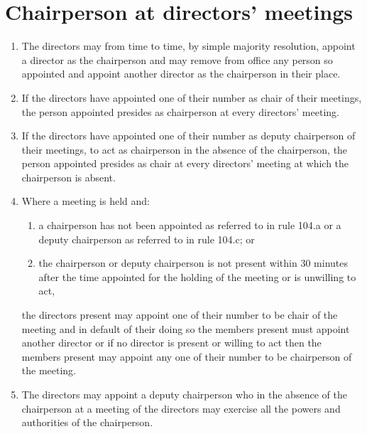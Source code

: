 \section{Chairperson at directors' meetings}

\begin{enumerate}[label=(\alph*)]
    \item The directors may from time to time, by simple majority resolution, appoint a director as the chairperson and may remove from office any person so appointed and appoint another director as the chairperson in their place.
    
    \item If the directors have appointed one of their number as chair of their meetings, the person appointed presides as chairperson at every directors' meeting.
    
    \item If the directors have appointed one of their number as deputy chairperson of their meetings, to act as chairperson in the absence of the chairperson, the person appointed presides as chair at every directors' meeting at which the chairperson is absent.
    
    \item Where a meeting is held and:
    \begin{enumerate}[label=(\roman*)]
        \item a chairperson has not been appointed as referred to in rule 104.a or a deputy chairperson as referred to in rule 104.c; or
        \item the chairperson or deputy chairperson is not present within 30 minutes after the time appointed for the holding of the meeting or is unwilling to act,
    \end{enumerate}
    
    the directors present may appoint one of their number to be chair of the meeting and in default of their doing so the members present must appoint another director or if no director is present or willing to act then the members present may appoint any one of their number to be chairperson of the meeting.
    
    \item The directors may appoint a deputy chairperson who in the absence of the chairperson at a meeting of the directors may exercise all the powers and authorities of the chairperson.
\end{enumerate} 